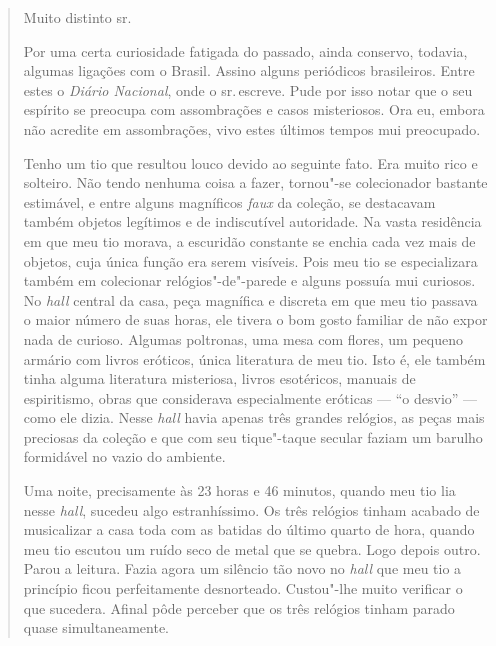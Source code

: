 \begin{quote}
Muito distinto sr.


Por uma certa curiosidade fatigada do passado, ainda conservo,
todavia, algumas ligações com o Brasil. Assino alguns periódicos
brasileiros. Entre estes o \emph{Diário Nacional}, onde o sr.\,escreve.
Pude por isso notar que o seu espírito se preocupa com assombrações e
casos misteriosos. Ora eu, embora não acredite em assombrações, vivo
estes últimos tempos mui preocupado.

Tenho um tio que resultou louco devido ao seguinte fato. Era muito
rico e solteiro. Não tendo nenhuma coisa a fazer, tornou"-se colecionador
bastante estimável, e entre alguns magníficos \emph{faux} da coleção, se
destacavam também objetos legítimos e de indiscutível autoridade. Na
vasta residência em que meu tio morava, a escuridão constante se enchia
cada vez mais de objetos, cuja única função era serem visíveis. Pois meu
tio se especializara também em colecionar relógios"-de"-parede e alguns
possuía mui curiosos. No \emph{hall} central da casa, peça magnífica e
discreta em que meu tio passava o maior número de suas horas, ele tivera
o bom gosto familiar de não expor nada de curioso. Algumas poltronas,
uma mesa com flores, um pequeno armário com livros eróticos, única
literatura de meu tio. Isto é, ele também tinha alguma literatura
misteriosa, livros esotéricos, manuais de espiritismo, obras que
considerava especialmente eróticas --- ``o desvio'' --- como ele dizia.
Nesse \emph{hall} havia apenas três grandes relógios, as peças mais preciosas
da coleção e que com seu tique"-taque secular faziam um barulho
formidável no vazio do ambiente.

Uma noite, precisamente às 23 horas e 46 minutos, quando meu tio lia
nesse \emph{hall}, sucedeu algo estranhíssimo. Os três relógios tinham
acabado de musicalizar a casa toda com as batidas do último quarto de
hora, quando meu tio escutou um ruído seco de metal que se quebra. Logo
depois outro. Parou a leitura. Fazia agora um silêncio tão novo no
\emph{hall} que meu tio a princípio ficou perfeitamente desnorteado.
Custou"-lhe muito verificar o que sucedera. Afinal pôde perceber que os
três relógios tinham parado quase simultaneamente.


\end{quote}
